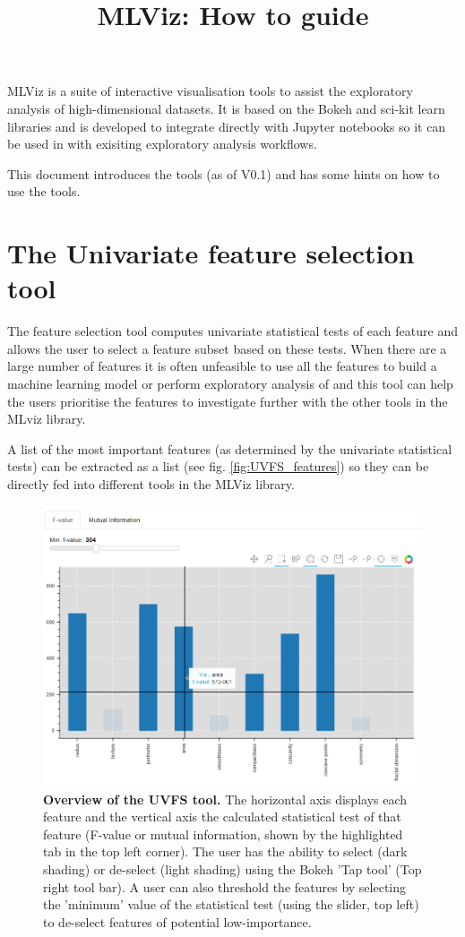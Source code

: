 \documentclass[11pt]{article} %
\title{MLViz: How to guide}
\date{} %
\begin{document}
\maketitle

MLViz is a suite of interactive visualisation tools to assist the exploratory analysis of high-dimensional datasets. It is based on the Bokeh and sci-kit learn libraries and is developed to integrate directly with Jupyter notebooks so it can be used in with exisiting exploratory analysis workflows.  

This document introduces the tools (as of V0.1) and has some hints on how to use the tools.

\section{The Univariate feature selection tool}

The feature selection tool computes univariate statistical tests of each feature and allows the user to select a feature subset based on these tests. When there are a large number of features it is often unfeasible to use all the features to build a machine learning model or perform exploratory analysis of and this tool can help the users prioritise the features to investigate further with the other tools in the MLviz library. 

A list of the most important features (as determined by the univariate statistical tests) can be extracted as a list (see fig. \ref{fig:UVFS_features}) so they can be directly fed into different tools in the MLViz library.

\begin{figure}[!h]
\centering
\includegraphics[width=4.5in]{images/UVFS_tool_annotated.png}
\caption{\textbf{Overview of the UVFS tool.} The horizontal axis displays each feature and the vertical axis the calculated statistical test of that feature (F-value or mutual information, shown by the highlighted tab in the top left corner). The user has the ability to select (dark shading) or de-select (light shading) using the Bokeh 'Tap tool' (Top right tool bar). A user can also threshold the features by selecting the 'minimum' value of the statistical test (using the slider, top left) to de-select features of potential low-importance.}
\label{fig:UVFS}
\end{figure}
\end{document}
